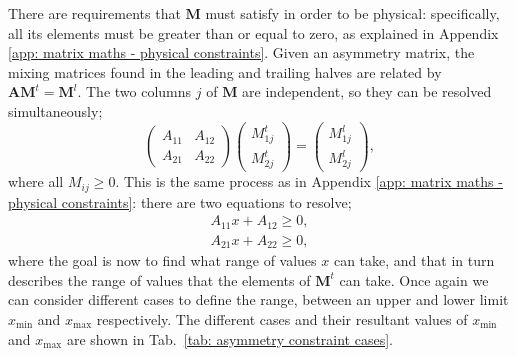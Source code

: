 There are requirements that $\mathbf{M}$ must satisfy in order to be physical: specifically, all its elements must be greater than or equal to zero, as explained in Appendix \ref{app: matrix maths - physical constraints}. Given an asymmetry matrix, the mixing matrices found in the leading and trailing halves are related by $\mathbf{AM}^t=\mathbf{M}^l$. The two columns $j$ of $\mathbf{M}$ are independent, so they can be resolved simultaneously;
\begin{equation}
    \begin{pmatrix} A_{11} & A_{12} \\ A_{21} & A_{22} \end{pmatrix} \begin{pmatrix} M^t_{1j} \\ M^t_{2j} \end{pmatrix} = \begin{pmatrix} M^l_{1j} \\ M^l_{2j} \end{pmatrix},
\end{equation}
where all $M_{ij}\geq 0$. This is the same process as in Appendix \ref{app: matrix maths - physical constraints}: there are two equations to resolve;
\begin{align}
    A_{11}x + A_{12} \geq 0,\label{eq: reduced asymmetry constraint 1.2}\\
    A_{21}x + A_{22} \geq 0,\label{eq: reduced asymmetry constraint 2.2}
\end{align}
where the goal is now to find what range of values $x$ can take, and that in turn describes the range of values that the elements of $\mathbf{M}^t$ can take. Once again we can consider different cases to define the range, between an upper and lower limit $x_\mathrm{min}$ and $x_\mathrm{max}$ respectively. The different cases and their resultant values of $x_\mathrm{min}$ and $x_\mathrm{max}$ are shown in  Tab.~\ref{tab: asymmetry constraint cases}.

